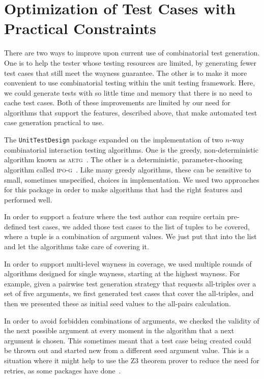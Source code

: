 \documentclass{juliacon}
\newcommand{\utd}{\texttt{UnitTestDesign}\xspace}
\begin{document}
\section{Optimization of Test Cases with Practical Constraints}\label{sec:implementation}

There are two ways to improve upon current use of combinatorial test generation. One is to help the tester whose testing resources are limited, by generating fewer test cases that still meet the wayness guarantee. The other is to make it more convenient to use combinatorial testing within the unit testing framework. Here, we could generate tests with so little time and memory that there is no need to cache test cases. Both of these improvements are limited by our need for algorithms that support the features, described above, that make automated test case generation practical to use.

\vskip 6pt
The \utd package expanded on the implementation of two $n$-way combinatorial interaction testing algorithms. One is the greedy, non-deterministic algorithm known as \textsc{aetg}~\cite{Cohen1997-lb}. The other is a deterministic, parameter-choosing algorithm called \textsc{ipo-g}~\cite{Lei2008-xt}. Like many greedy algorithms, these can be sensitive to small, sometimes unspecified, choices in implementation. We used two approaches for this package in order to make algorithms that had the right features and performed well.

\vskip 6pt
In order to support a feature where the test author can require certain pre-defined test cases, we added those test cases to the list of tuples to be covered, where a tuple is a combination of argument values. We just put that into the list and let the algorithms take care of covering it.

\vskip 6pt
In order to support multi-level wayness in coverage, we used multiple rounds of algorithms designed for single wayness, starting at the highest wayness. For example, given a pairwise test generation strategy that requests all-triples over a set of five arguments, we first generated test cases that cover the all-triples, and then we presented these as initial seed values to the all-pairs calculation.

\vskip 6pt
In order to avoid forbidden combinations of arguments, we checked the validity of the next possible argument at every moment in the algorithm that a next argument is chosen. This sometimes meant that a test case being created could be thrown out and started new from a different seed argument value. This is a situation where it might help to use the Z3 theorem prover to reduce the need for retries, as some packages have done~\cite{Nie2011-yl}.
\end{document}
